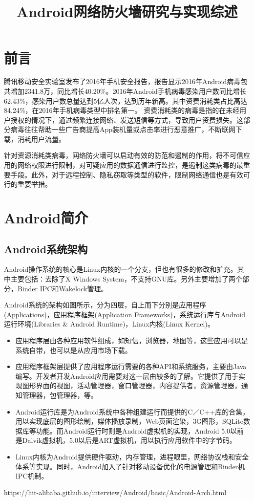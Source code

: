 \documentclass{article}
\title{Android网络防火墙研究与实现综述}
\begin{document}
\section{前言}

腾讯移动安全实验室发布了2016年手机安全报告，报告显示2016年Android病毒包共增加2341.8万，同比增长40.20\%。2016年Android手机病毒感染用户数同比增长62.43\%，感染用户数总量达到5亿人次，达到历年新高。其中资费消耗类占比高达84.24\%，在2016年手机病毒类型中排名第一。
资费消耗类的病毒是指的在未经用户授权的情况下，通过频繁连接网络、发送短信等方式，导致用户资费损失。这部分病毒往往帮助一些广告商提高App装机量或点击率进行恶意推广，不断联网下载，消耗用户流量。

针对资源消耗类病毒，网络防火墙可以启动有效的防范和遏制的作用，将不可信应用的网络权限进行限制，对可疑应用的数据通信进行监控，是遏制这类病毒的最重要手段。此外，对于远程控制、隐私窃取等类型的软件，限制网络通信也是有效可行的重要举措。

\section{Android简介}


\subsection{Android系统架构}

Android操作系统的核心是Linux内核的一个分支，但也有很多的修改和扩充。其中主要包括：去除了X Windows System，不支持GNU库。另外主要增加了两个部分，Binder IPC和Wakelock管理。

Android系统的架构如图所示，分为四层，自上而下分别是应用程序(Applications)，应用程序框架(Application Frameworks)，系统运行库与Android运行环境(Libraries \& Android Runtime)，Linux内核(Linux Kernel)。
\begin{itemize}
\item 应用程序层由各种应用软件组成，如短信，浏览器，地图等，这些应用可以是系统自带，也可以是从应用市场下载。
\item 应用程序框架层提供了应用程序运行需要的各种API和系统服务，主要由Java编写。开发者开发Android应用需要对这一层由较多的了解。它提供了用于实现图形界面的视图，活动管理器，窗口管理器，内容提供者，资源管理器，通知管理器，包管理器，等。
\item Android运行库是为Android系统中各种组建运行而提供的C／C++库的合集，用以实现底层的图形绘制，媒体播放录制，Web页面渲染，3G图形，SQLite数据库等功能。而Android运行时则是Android虚拟机的实现，Android 5.0以前是Dalvik虚拟机，5.0以后是ART虚拟机，用以执行应用软件中的字节码。
\item Linux内核为Android提供硬件驱动，内存管理，进程眼里，网络协议栈和安全体系等实现。同时，Android加入了针对移动设备优化的电源管理和Binder机IPC机制。
\end{itemize}
https://hit-alibaba.github.io/interview/Android/basic/Android-Arch.html
\end{document}
